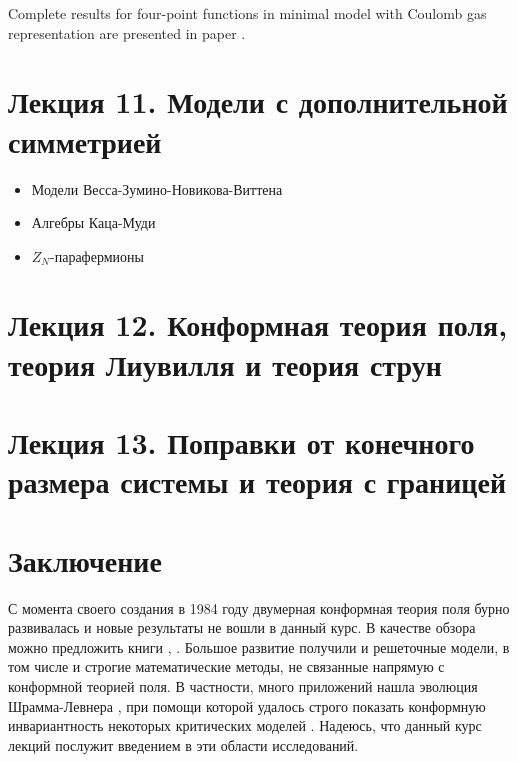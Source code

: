\documentclass[a4paper,12pt]{article}
\theoremstyle{definition}
\theoremstyle{definition}
\theoremstyle{definition}
\begin{document}
Complete results for four-point functions in minimal model with Coulomb gas representation are
presented in paper \cite{dotsenko1985four}. 


\section{ Лекция 11. Модели с дополнительной симметрией}
  \begin{itemize}
  \item Модели Весса-Зумино-Новикова-Виттена
  \item Алгебры Каца-Муди
  \item $Z_{N}$-парафермионы
  \end{itemize}
\section{Лекция 12. Конформная теория поля, теория Лиувилля и теория струн}

\section{ Лекция 13. Поправки от конечного размера системы и теория с границей}



\section{Заключение}
\label{sec:conclusion}

С момента своего создания в 1984 году двумерная конформная теория поля бурно развивалась и новые результаты не вошли в данный курс. В качестве обзора можно предложить книги \cite{difrancesco1997cft}, \cite{schottenloher2008mathematical}. Большое развитие получили и решеточные модели, в том числе и строгие математические методы, не связанные напрямую с конформной теорией поля. В частности, много приложений нашла эволюция Шрамма-Левнера \cite{schramm2000scaling}, при помощи которой удалось строго показать конформную инвариантность некоторых критических моделей \cite{chelkak2009universality,smirnov2001critical}. Надеюсь, что данный курс лекций послужит введением в эти области исследований. 

{}

\end{document}
